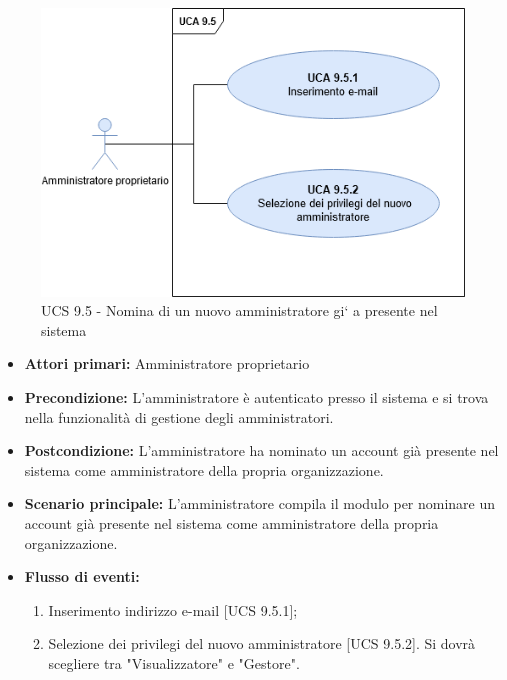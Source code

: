 \begin{figure}[h!]
    \centering
      \includegraphics[scale=0.5]{Sezioni/UseCase/Immagini/UCS9.5.png}
    \caption{UCS 9.5 - Nomina di un nuovo amministratore gi` a presente nel sistema}
  \end{figure}


\begin{itemize}
\item \textbf{Attori primari:} Amministratore proprietario
\item \textbf{Precondizione:} L'amministratore è autenticato presso il sistema e si trova nella funzionalità di gestione degli amministratori.
\item \textbf{Postcondizione:} L'amministratore ha nominato un account già presente nel sistema come amministratore della propria organizzazione.
\item \textbf{Scenario principale:} L'amministratore compila il modulo per nominare un account già presente nel sistema come amministratore della propria organizzazione.
\item \textbf{Flusso di eventi:} %
  \begin{enumerate}
        \item Inserimento indirizzo e-mail [UCS 9.5.1];
        \item Selezione dei privilegi del nuovo amministratore [UCS 9.5.2]. Si dovrà scegliere tra "Visualizzatore" e "Gestore".
    \end{enumerate}
\end{itemize}

